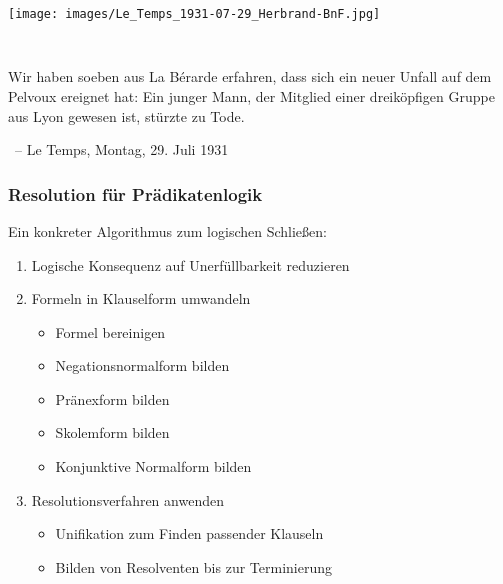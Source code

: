 \documentclass[aspectratio=1610,onlymath]{beamer}
\begin{document}
\maketitle

\bgroup
{}
\begin{frame}[plain]\label{frame_temps_a}
\color{white}
\begin{center}
\texttt{[image: images/Le\_Temps\_1931-07-29\_Herbrand-BnF.jpg]}\vspace{1cm}

\tt
\begin{minipage}{13.5cm}\normalsize
Wir haben soeben aus La Bérarde erfahren, dass sich ein neuer Unfall auf dem Pelvoux ereignet hat:
Ein junger Mann, der Mitglied einer dreiköpfigen Gruppe aus Lyon gewesen ist, stürzte zu Tode.
\end{minipage}

% 
\bigskip\normalsize

~-- Le Temps, Montag, 29. Juli 1931
\end{center}

\end{frame}
\egroup

\begin{frame}\frametitle{Resolution für Prädikatenlogik}

Ein konkreter Algorithmus zum logischen Schließen:
\begin{enumerate}[(1)]
\item \alert{Logische Konsequenz auf Unerfüllbarkeit reduzieren}
\item \alert{Formeln in Klauselform umwandeln}
	\begin{itemize}
	\item Formel bereinigen
	\item Negationsnormalform bilden
	\item Pränexform bilden
	\item Skolemform bilden
	\item Konjunktive Normalform bilden
	\end{itemize}
\item \alert{Resolutionsverfahren anwenden}
	\begin{itemize}
	\item Unifikation zum Finden passender Klauseln
	\item \textcolor{devilscss}{Bilden von Resolventen bis zur Terminierung}
	\end{itemize}
\end{enumerate}

\end{frame}
\end{document}
